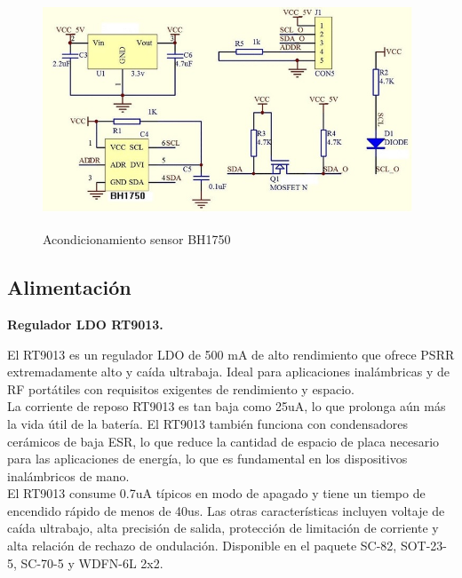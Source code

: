 \begin{figure}[H]
    \centering
    \includegraphics[width=11cm, height=7cm]{imagenes/acondicionamientos sensor BH1750.jpg}
    \caption{Acondicionamiento sensor BH1750}
    \label{imag:acondicionamiento_BH1750}
\end{figure}

\vspace{1cm}

\subsection{Alimentación}

\textbf{Regulador LDO RT9013.}\newline

El RT9013 es un regulador LDO de 500 mA de alto rendimiento que ofrece PSRR extremadamente alto y caída ultrabaja. Ideal para aplicaciones inalámbricas y de RF portátiles con requisitos exigentes de rendimiento y espacio.\\

La corriente de reposo RT9013 es tan baja como 25uA, lo que prolonga aún más la vida útil de la batería. El RT9013 también funciona con condensadores cerámicos de baja ESR, lo que reduce la cantidad de espacio de placa necesario para las aplicaciones de energía, lo que es fundamental en los dispositivos inalámbricos de mano.\\

El RT9013 consume 0.7uA típicos en modo de apagado y tiene un tiempo de encendido rápido de menos de 40us. Las otras características incluyen voltaje de caída ultrabajo, alta precisión de salida, protección de limitación de corriente y alta relación de rechazo de ondulación. Disponible en el paquete SC-82, SOT-23-5, SC-70-5 y WDFN-6L 2x2.\\

